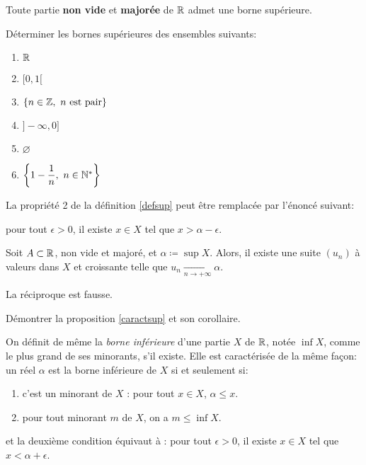 \documentclass[../main.tex]{subfiles}
\begin{document}
\begin{thm}
    Toute partie \textbf{non vide} et \textbf{majorée} de $\mathbb R$ admet une borne supérieure.
\end{thm}

\begin{exo}[F]
    Déterminer les bornes supérieures des ensembles suivants:
    \begin{multicols}{2}
    \begin{enumerate}
        \item $\mathbb R$
        \item $[0,1[$
        \item $\{n\in\mathbb Z,\ n\text{ est pair}\}$
        \item $]-\infty, 0]$
        \item $\varnothing$
        \item $\left\{1-\dfrac{1}{n},\ n\in\N^*\right\}$
    \end{enumerate}
    \end{multicols}
\end{exo}

\begin{prop} \label{caractsup}
    La propriété 2 de la définition \ref{defsup} peut être remplacée par l'énoncé suivant:
    
    \textup{pour tout $\epsilon > 0$, il existe $x\in X$ tel que $x>\alpha - \epsilon$.}
\end{prop}

\begin{cor}
    Soit $A\subset\mathbb R$, non vide et majoré, et $\alpha \coloneqq \sup X$. Alors, il existe une suite $(u_n)$ à valeurs dans $X$ et croissante telle que $u_n\xrightarrow[n\to+\infty]{}\alpha$.
\end{cor}

\begin{rem}
	La réciproque est fausse.
\end{rem}

\begin{exo}[M]
    Démontrer la proposition \ref{caractsup} et son corollaire.
\end{exo}

\begin{mydef}\label{definf}
	On définit de même la \textit{borne inférieure} d'une partie $X$ de $\mathbb R$, notée $\inf X$, comme le plus grand de ses minorants, s'il existe. Elle est caractérisée de la même façon: un réel $\alpha$ est la borne inférieure de $X$ si et seulement si:\begin{enumerate}
		\item c'est un minorant de $X$ : pour tout $x\in X$, $\alpha \leq x$.
		\item pour tout minorant $m$ de $X$, on a $m\leq\inf X$.
	\end{enumerate}
	et la deuxième condition équivaut à : pour tout $\epsilon>0$, il existe $x\in X$ tel que $x<\alpha + \epsilon$.
\end{mydef}
\end{document}
